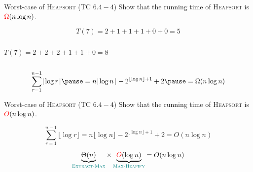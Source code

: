 \begin{frame}{}
  \begin{exampleblock}{Worst-case of \textsc{Heapsort} (TC $6.4-4$)}
    Show that the  running time of \textsc{Heapsort} is $\textcolor{red}{\Omega}(n \log n)$.
  \end{exampleblock}

  \vspace{0.30cm}
\end{frame}

\begin{frame}{}
  \begin{center}
    {}
  \end{center}


  \pause
  \vspace{-0.30cm}
  \[
    T(7) = 2 + 1 + 1 + 1 + 0 + 0 = 5
  \]

\end{frame}

\begin{frame}{}
  \begin{columns}
      \pause
      \[
        T(7) = 2 + 2 + 2 + 1 + 1 + 0 = 8
      \]
      \pause 
      \begin{center}
        {\footnotesize {}}
      \end{center}
      \pause
  \end{columns}

  \pause
  \vspace{0.60cm}
  \[
    \sum_{r=1}^{n-1} \lfloor \log r \rfloor \pause = n \lfloor \log  n \rfloor - 2^{\lfloor \log n \rfloor + 1} + 2 \pause = \Omega(n \log n)
  \]
\end{frame}

\begin{frame}{}
  \begin{exampleblock}{Worst-case of \textsc{Heapsort} (TC $6.4-4$)}
    Show that the  running time of \textsc{Heapsort} is $\textcolor{red}{O}(n \log n)$.
  \end{exampleblock}

  \pause
  \[
    \sum_{r=1}^{n-1} \lfloor \log r \rfloor = n \lfloor \log  n \rfloor - 2^{\lfloor \log n \rfloor + 1} + 2 = O(n \log n)
  \]

  \pause
  \vspace{0.30cm}
  \centerline{}

  \pause
  \vspace{0.30cm}
  \[
    \underbrace{\Theta(n)}_{\textcolor{teal}{\textsc{Extract-Max}}} \times \underbrace{\textcolor{red}{O}(\log n)}_{\textcolor{teal}{\textsc{Max-Heapify}}} = O(n \log n)
  \]
\end{frame}


